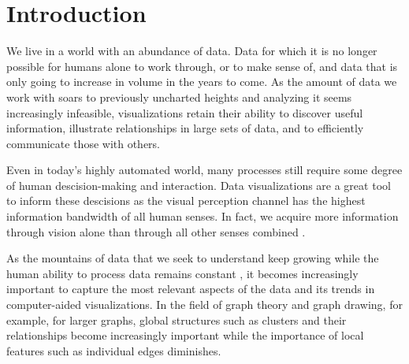 \chapter{Introduction}
\label{chap:introduction}

We live in a world with an abundance of data. Data for which it is no longer possible for humans alone to work through, or to make sense of, and data that is only going to increase in volume in the years to come. As the amount of data we work with soars to previously uncharted heights and analyzing it seems increasingly infeasible, visualizations retain their ability to discover useful information, illustrate relationships in large sets of data, and to efficiently communicate those with others.

Even in today's highly automated world, many processes still require some degree of human descision-making and interaction. Data visualizations are a great tool to inform these descisions as the visual perception channel has the highest information bandwidth of all human senses. In fact, we acquire more information through vision alone than through all other senses combined \cite{ware2019information}.

As the mountains of data that we seek to understand keep growing while the human ability to process data remains constant \cite{dachsbacher2019visualisierung}, it becomes increasingly important to capture the most relevant aspects of the data and its trends in computer-aided visualizations. In the field of graph theory and graph drawing, for example, for larger graphs, global structures such as clusters and their relationships become increasingly important while the importance of local features such as  individual edges diminishes.




